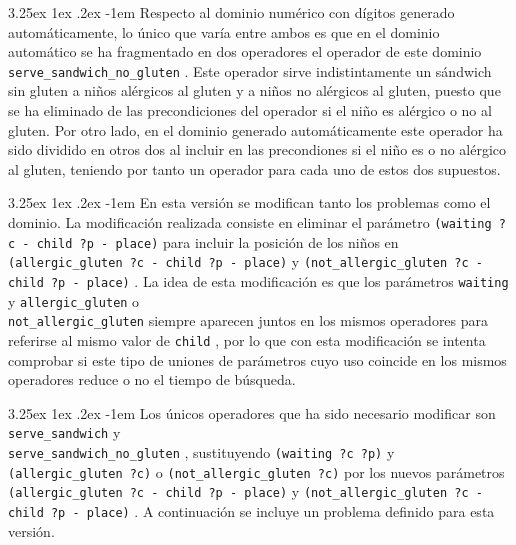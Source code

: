 \documentclass{article}
\makeatletter
\newcommand{\cool}[1] {
        {\texttt{#1}}
    }
\newcounter{subsubsubsection}
\renewcommand\paragraph{\@startsection{paragraph}{5}{\z@}%
      {3.25ex \@plus1ex \@minus.2ex}%
      {-1em}%
      {\normalfont\normalsize\bfseries}}
\makeatother
\begin{document}
    \paragraph{}
    Respecto al dominio numérico con dígitos generado automáticamente, lo único que varía entre ambos es que en el dominio automático se ha fragmentado en dos operadores el operador de este dominio \cool{serve\_sandwich\_no\_gluten}. Este operador sirve indistintamente un sándwich sin gluten a niños alérgicos al gluten y a niños no alérgicos al gluten, puesto que se ha eliminado de las precondiciones del operador si el niño es alérgico o no al gluten. Por otro lado, en el dominio generado automáticamente este operador ha sido dividido en otros dos al incluir en las precondiones si el niño es o no alérgico al gluten, teniendo por tanto un operador para cada uno de estos dos supuestos.
    
    
    \paragraph{}
    En esta versión se modifican tanto los problemas como el dominio. La modificación realizada consiste en eliminar el parámetro \cool{(waiting ?c - child ?p - place)} para incluir la posición de los niños en \cool{(allergic\_gluten ?c - child ?p - place)} y \cool{(not\_allergic\_gluten ?c - child ?p - place)}. La idea de esta modificación es que los parámetros \cool{waiting} y \cool{allergic\_gluten} o \\ \cool{not\_allergic\_gluten} siempre aparecen juntos en los mismos operadores para referirse al mismo valor de \cool{child}, por lo que con esta modificación se intenta comprobar si este tipo de uniones de parámetros cuyo uso coincide en los mismos operadores reduce o no el tiempo de búsqueda.
    
    \paragraph{}
    Los únicos operadores que ha sido necesario modificar son \cool{serve\_sandwich} y \\ \cool{serve\_sandwich\_no\_gluten}, sustituyendo \cool{(waiting ?c ?p)} y \cool{(allergic\_gluten ?c)} o \cool{(not\_allergic\_gluten ?c)} por los nuevos parámetros \cool{(allergic\_gluten ?c - child ?p - place)} y \cool{(not\_allergic\_gluten ?c - child ?p - place)}. A continuación se incluye un problema definido para esta versión.
    
\end{document}
